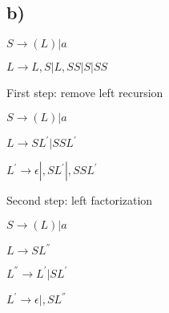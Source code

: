 \subsection*{b)}

$S \rightarrow (L) | a$

$L \rightarrow L,S | L,SS | S | SS$

First step: remove left recursion

$S \rightarrow (L) | a$

$L \rightarrow SL^{'} | SSL^{'}$

$L^{'} \rightarrow \epsilon | ,SL^{'} | ,SSL^{'}$

Second step: left factorization

$S \rightarrow (L) | a$

$L \rightarrow SL^{''}$

$L^{''} \rightarrow L^{'} | SL^{'}$

$L^{'} \rightarrow \epsilon | ,SL^{''}$

